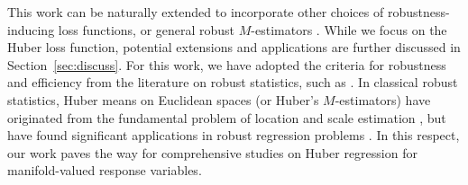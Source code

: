 \documentclass[preprint]{imsart}
\def\Frechet{Fr\'{e}chet}
\theoremstyle{plain}
\theoremstyle{remark}
\begin{document}
 

%

 
   
 
 
This work can be naturally extended to incorporate other choices of robustness-inducing loss functions, or general robust $M$-estimators \citep{huber2004robust}. While we focus on the Huber loss function, potential extensions and applications are further discussed in Section~\ref{sec:discuss}. For this work, we have adopted the criteria for robustness and efficiency from the literature on robust statistics, such as \cite{huber2004robust}. In classical robust statistics, Huber means on Euclidean spaces (or Huber's $M$-estimators) have originated from the fundamental problem of location and scale estimation \citep{huber1964robust}, but have found significant applications in robust regression problems \citep{fan2017estimation, jiang2019robust, zhou2018new}. In this respect, our work paves the way for comprehensive studies on Huber regression for manifold-valued response variables. 
 





  
 
\end{document}
